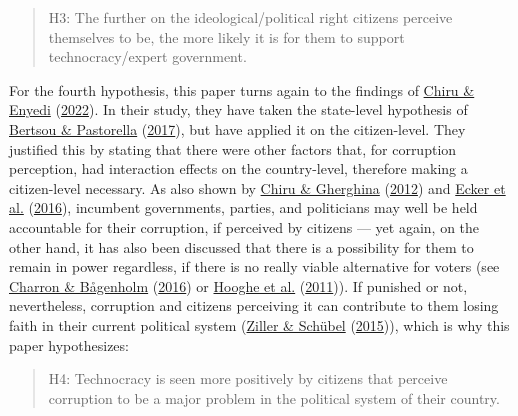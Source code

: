 \documentclass[
  12pt,
  english,
]{article}
\begin{document}
\begin{quote}
H3: The further on the ideological/political right citizens perceive
themselves to be, the more likely it is for them to support
technocracy/expert government.
\end{quote}

For the fourth hypothesis, this paper turns again to the findings of
\protect\hyperlink{ref-chiru2022wants}{Chiru \& Enyedi}
(\protect\hyperlink{ref-chiru2022wants}{2022}). In their study, they
have taken the state-level hypothesis of
\protect\hyperlink{ref-bertsou2017technocratic}{Bertsou \& Pastorella}
(\protect\hyperlink{ref-bertsou2017technocratic}{2017}), but have
applied it on the citizen-level. They justified this by stating that
there were other factors that, for corruption perception, had
interaction effects on the country-level, therefore making a
citizen-level necessary. As also shown by
\protect\hyperlink{ref-chiru2012voter}{Chiru \& Gherghina}
(\protect\hyperlink{ref-chiru2012voter}{2012}) and
\protect\hyperlink{ref-ecker2016corruption}{Ecker et al.}
(\protect\hyperlink{ref-ecker2016corruption}{2016}), incumbent
governments, parties, and politicians may well be held accountable for
their corruption, if perceived by citizens --- yet again, on the other
hand, it has also been discussed that there is a possibility for them to
remain in power regardless, if there is no really viable alternative for
voters (see \protect\hyperlink{ref-charron2016ideology}{Charron \&
Bågenholm} (\protect\hyperlink{ref-charron2016ideology}{2016}) or
\protect\hyperlink{ref-hooghe2011distrusting}{Hooghe et al.}
(\protect\hyperlink{ref-hooghe2011distrusting}{2011})). If punished or
not, nevertheless, corruption and citizens perceiving it can contribute
to them losing faith in their current political system
(\protect\hyperlink{ref-ziller2015pure}{Ziller \& Schübel}
(\protect\hyperlink{ref-ziller2015pure}{2015})), which is why this paper
hypothesizes:

\begin{quote}
H4: Technocracy is seen more positively by citizens that perceive
corruption to be a major problem in the political system of their
country.
\end{quote}
\end{document}
